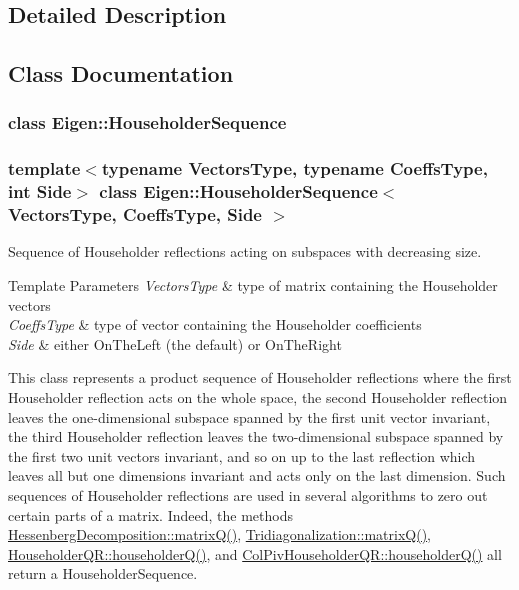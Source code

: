 \subsection{Detailed Description}


\subsection{Class Documentation}
\label{class_eigen_1_1_householder_sequence}
\subsubsection{class Eigen\+:\+:Householder\+Sequence}
\subsubsection*{template$<$typename Vectors\+Type, typename Coeffs\+Type, int Side$>$\newline
class Eigen\+::\+Householder\+Sequence$<$ Vectors\+Type, Coeffs\+Type, Side $>$}

Sequence of Householder reflections acting on subspaces with decreasing size. 


\begin{DoxyTemplParams}{Template Parameters}
{\em Vectors\+Type} & type of matrix containing the Householder vectors \\
\hline
{\em Coeffs\+Type} & type of vector containing the Householder coefficients \\
\hline
{\em Side} & either On\+The\+Left (the default) or On\+The\+Right\\
\hline
\end{DoxyTemplParams}
This class represents a product sequence of Householder reflections where the first Householder reflection acts on the whole space, the second Householder reflection leaves the one-\/dimensional subspace spanned by the first unit vector invariant, the third Householder reflection leaves the two-\/dimensional subspace spanned by the first two unit vectors invariant, and so on up to the last reflection which leaves all but one dimensions invariant and acts only on the last dimension. Such sequences of Householder reflections are used in several algorithms to zero out certain parts of a matrix. Indeed, the methods \hyperlink{group___eigenvalues___module_a346441e4902a58d43d698ac3da6ff791}{Hessenberg\+Decomposition\+::matrix\+Q()}, \hyperlink{group___eigenvalues___module_a000f7392eda930576ffd2af1fae54af2}{Tridiagonalization\+::matrix\+Q()}, \hyperlink{group___q_r___module_affd506c10ef2d25f56e7b1f9f25ff885}{Householder\+Q\+R\+::householder\+Q()}, and \hyperlink{group___q_r___module_a28ab9d8916ca609c5469c4c192fbfa28}{Col\+Piv\+Householder\+Q\+R\+::householder\+Q()} all return a Householder\+Sequence.

